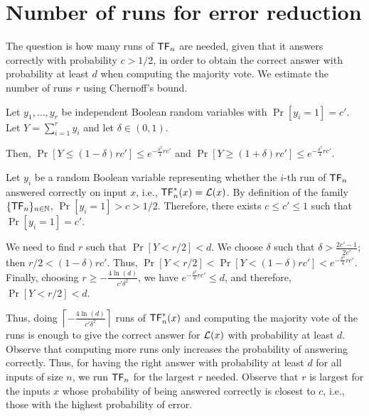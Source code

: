 \section{Number of runs for error reduction}\label{appendix:runs-error-red}

The question is how many runs of $\mathsf{TF}_n$ are needed, given that it answers correctly with probability $c > 1/2$, in order to obtain the correct answer with probability at least $d$ when computing the majority vote.
We estimate the number of runs $r$ using Chernoff's bound.

\begin{theorem}
    Let $y_1, \dots, y_r$ be independent Boolean random variables with $\Pr[y_i = 1] = c'$.
    Let $Y = \sum_{i=1}^r y_i$ and let $\delta \in (0,1)$.

    Then, $\Pr[Y \leq (1-\delta)rc'] \leq e^{-\frac{\delta^2}{4}rc'}$ and $\Pr[Y \geq (1+\delta)rc'] \leq e^{-\frac{\delta^2}{4}rc'}$.
\end{theorem}

Let $y_i$ be a random Boolean variable representing whether the $i$-th run of $\mathsf{TF}_n$ answered correctly on input $x$, i.e., $\mathsf{TF}_n^*(x) = \mathcal{L}(x)$.
By definition of the family $\{\mathsf{TF}_n\}_{n\in\mathbb{N}}$, \mbox{$\Pr[y_i = 1] > c > 1/2$}.
Therefore, there exists $c \leq c' \leq 1$ such that $\Pr[y_i = 1] = c'$.

We need to find $r$ such that $\Pr[Y < r/2] < d$.
We choose $\delta$ such that $\delta > \frac{2c'-1}{2c'}$; then $r/2 < (1-\delta)rc'$.
Thus, $\Pr[Y < r/2] < \Pr[Y < (1-\delta)rc'] < e^{-\frac{\delta^2}{4}rc'}$.
Finally, choosing $r \geq -\frac{4\ln(d)}{c'\delta^2}$, we have $e^{-\frac{\delta^2}{4}rc'} \leq d$, and therefore, $\Pr[Y < r/2] < d$.

Thus, doing $\left\lceil-\frac{4\ln(d)}{c'\delta^2}\right\rceil$ runs of $\mathsf{TF}_n^*(x)$ and computing the majority vote of the runs is enough to give the correct answer for $\mathcal{L}(x)$ with probability at least $d$.
Observe that computing more runs only increases the probability of answering correctly.
Thus, for having the right answer with probability at least $d$ for all inputs of size $n$, we run $\mathsf{TF}_n$ for the largest $r$ needed.
Observe that $r$ is largest for the inputs $x$ whose probability of being answered correctly is closest to $c$, i.e., those with the highest probability of error.